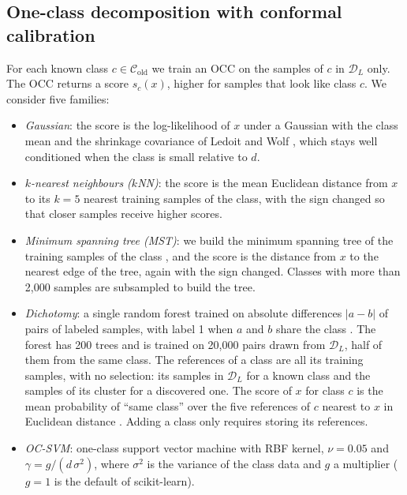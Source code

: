 \documentclass[pdflatex,sn-basic]{sn-jnl}
\newcommand{\DL}{\mathcal{D}_L}
\newcommand{\Cold}{\mathcal{C}_{\mathrm{old}}}
\begin{document}
\subsection{One-class decomposition with conformal calibration}\label{sec:occ}

For each known class $c \in \Cold$ we train an OCC on the samples of $c$ in $\DL$ only. The OCC returns a score $s_c(x)$, higher for samples that look like class $c$. We consider five families:

\begin{itemize}
\item \emph{Gaussian}: the score is the log-likelihood of $x$ under a Gaussian with the class mean and the shrinkage covariance of Ledoit and Wolf \citep{ledoit2004shrinkage}, which stays well conditioned when the class is small relative to $d$.
\item \emph{$k$-nearest neighbours ($k$NN)}: the score is the mean Euclidean distance from $x$ to its $k=5$ nearest training samples of the class, with the sign changed so that closer samples receive higher scores.
\item \emph{Minimum spanning tree (MST)}: we build the minimum spanning tree of the training samples of the class \citep{juszczak2009mstdd}, and the score is the distance from $x$ to the nearest edge of the tree, again with the sign changed. Classes with more than 2,000 samples are subsampled to build the tree.
\item \emph{Dichotomy}: a single random forest \citep{breiman2001rf} trained on absolute differences $|a-b|$ of pairs of labeled samples, with label 1 when $a$ and $b$ share the class \citep{cha2000dichotomy}. The forest has 200 trees and is trained on 20,000 pairs drawn from $\DL$, half of them from the same class. The references of a class are all its training samples, with no selection: its samples in $\DL$ for a known class and the samples of its cluster for a discovered one. The score of $x$ for class $c$ is the mean probability of ``same class'' over the five references of $c$ nearest to $x$ in Euclidean distance \citep{teixeira2025osr}. Adding a class only requires storing its references.
\item \emph{OC-SVM}: one-class support vector machine \citep{scholkopf2001ocsvm} with RBF kernel, $\nu = 0.05$ and $\gamma = g/(d\,\sigma^2)$, where $\sigma^2$ is the variance of the class data and $g$ a multiplier ($g=1$ is the default of scikit-learn).
\end{itemize}
\end{document}
